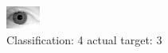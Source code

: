 \begin{figure}[h!]
\begin{center}
\includegraphics[width=0.60\columnwidth]{figures/ID2072_class_4_target_3.png}
\end{center}
\caption{ Classification: 4 actual target: 3}
\label{fig:ID2072_class_4_target_3}
\end{figure}
